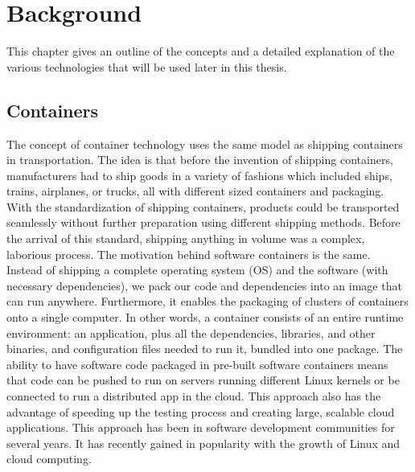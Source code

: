 \chapter{Background}
\label{Background}

This chapter gives an outline of the concepts and a detailed explanation of the various technologies that will be used later in this thesis.

	\section{Containers}
	\label{Background:Containers}
	The concept of container technology uses the same model as shipping containers in transportation. The idea is that before the invention of shipping containers, manufacturers had to ship goods in a variety of fashions which included ships, trains, airplanes, or trucks, all with different sized containers and packaging.
	With the standardization of shipping containers, products could be transported seamlessly without further preparation using different shipping methods. Before the arrival of this standard, shipping anything in volume was a complex, laborious process. The motivation behind software containers is the same. \cite[P.~1]{Kinnary2018}\\

	Instead of shipping a complete operating system (OS) and the software (with necessary dependencies), we pack our code and dependencies into an image that can run anywhere. Furthermore,  it enables the packaging of clusters of containers onto a single computer. In other words, a container consists of an entire runtime environment: an application, plus all the dependencies, libraries, and other binaries, and configuration files needed to run it, bundled into one package.
	The ability to have software code packaged in pre-built software containers means that code can be pushed to run on servers running different Linux kernels or be connected to run a distributed app in the cloud. This approach also has the advantage of speeding up the testing process and creating large, scalable cloud applications. This approach has been in software development communities for several years. It has recently gained in popularity with the growth of Linux and cloud computing. \cite[P.~2]{Kinnary2018}\\
	
